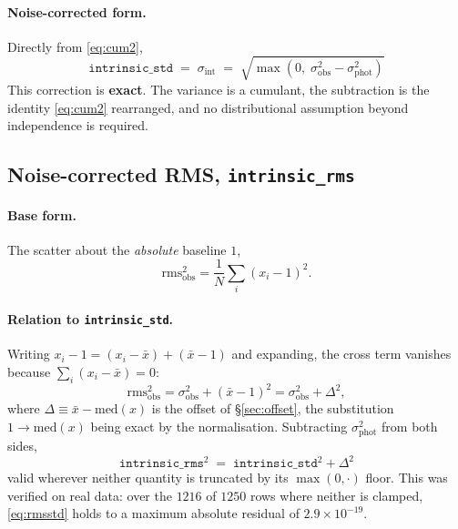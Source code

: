\documentclass[11pt]{article}
\newcommand{\istd}{\texttt{intrinsic\_std}}
\newcommand{\irms}{\texttt{intrinsic\_rms}}
\newcommand{\sigobs}{\sigma_{\mathrm{obs}}}
\newcommand{\sigphot}{\sigma_{\mathrm{phot}}}
\newcommand{\sigint}{\sigma_{\mathrm{int}}}
\begin{document}
\paragraph{Noise-corrected form.} Directly from \eqref{eq:cum2},
%
\begin{equation}
  \boxed{\;\istd \;=\; \sigint \;=\; \sqrt{\max\!\left(0,\;
         \sigobs^{2} - \sigphot^{2}\right)}\;}
  \label{eq:istd}
\end{equation}
%
This correction is \textbf{exact}. The variance is a cumulant, the subtraction is
the identity \eqref{eq:cum2} rearranged, and no distributional assumption beyond
independence is required.

\subsection{Noise-corrected RMS, \irms}
\label{sec:rms}

\paragraph{Base form.} The scatter about the \emph{absolute} baseline $1$,
%
\begin{equation}
  \mathrm{rms}_{\mathrm{obs}}^{2} = \frac{1}{N}\sum_{i}\left(x_i - 1\right)^{2}.
  \label{eq:rmsobs}
\end{equation}

\paragraph{Relation to \istd.} Writing $x_i - 1 = (x_i - \bar{x}) + (\bar{x}-1)$
and expanding, the cross term vanishes because $\sum_i (x_i - \bar{x}) = 0$:
%
\begin{equation}
  \mathrm{rms}_{\mathrm{obs}}^{2}
    = \sigobs^{2} + \left(\bar{x} - 1\right)^{2}
    = \sigobs^{2} + \Delta^{2},
  \label{eq:rmsidentity}
\end{equation}
%
where $\Delta \equiv \bar{x} - \mathrm{med}(x)$ is the offset of
\S\ref{sec:offset}, the substitution $1 \to \mathrm{med}(x)$ being exact by the
normalisation. Subtracting $\sigphot^2$ from both sides,
%
\begin{equation}
  \boxed{\;\irms^{2} \;=\; \istd^{2} + \Delta^{2}\;}
  \label{eq:rmsstd}
\end{equation}
%
valid wherever neither quantity is truncated by its $\max(0,\cdot)$ floor. This
was verified on real data: over the $1216$ of $1250$ rows where neither is
clamped, \eqref{eq:rmsstd} holds to a maximum absolute residual of
$2.9\times10^{-19}$.
\end{document}
